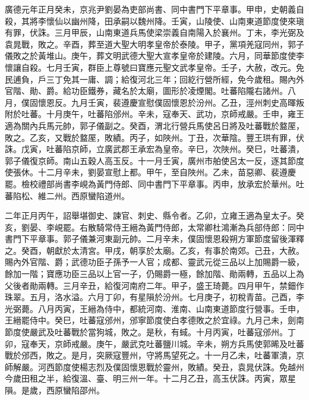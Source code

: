 \begin{pinyinscope}
 廣德元年正月癸未，京兆尹劉晏為吏部尚書、同中書門下平章事。甲申，史朝義自殺，其將李懷仙以幽州降，田承嗣以魏州降。壬寅，山陵使、山南東道節度使來瑱有罪，伏誅。三月甲辰，山南東道兵馬使梁崇義自南陽入於襄州。丁未，李光弼及袁晁戰，敗之。辛酉，葬至道大聖大明孝皇帝於泰陵。甲子，黨項羌寇同州，郭子儀敗之於黃堆山。庚午，葬文明武德大聖大宣孝皇帝於建陵。六月，同華節度使李懷讓自殺。七月壬寅，群臣上尊號曰寶應元聖文武孝皇帝。壬子，大赦，改元。免民逋負，戶三丁免其一庸、調；給復河北三年；回紇行營所經，免今歲租。賜內外官階、勛、爵。給功臣鐵券，藏名於太廟，圖形於凌煙閣。吐蕃陷隴右諸州。八月，僕固懷恩反。九月壬寅，裴遵慶宣慰僕固懷恩於汾州。乙丑，涇州刺史高暉叛附於吐蕃。十月庚午，吐蕃陷邠州。辛未，寇奉天、武功，京師戒嚴。壬申，雍王適為關內兵馬元帥，郭子儀副之。癸酉，渭北行營兵馬使呂日將及吐蕃戰於盩厔，敗之。乙亥，又戰於盩厔，敗績。丙子，如陜州。丁丑，次華陰。豐王珙有罪，伏誅。戊寅，吐蕃陷京師，立廣武郡王承宏為皇帝。辛巳，次陜州。癸巳，吐蕃潰，郭子儀復京師。南山五穀人高玉反。十一月壬寅，廣州市舶使呂太一反，逐其節度使張休。十二月辛未，劉晏宣慰上都。甲午，至自陜州。乙未，苗惡卿、裴遵慶罷。檢校禮部尚書李峴為黃門侍郎、同中書門下平章事。丙申，放承宏於華州。吐蕃陷松、維二州。西原蠻陷道州。



 二年正月丙午，詔舉堪御史、諫官、刺史、縣令者。乙卯，立雍王適為皇太子。癸亥，劉晏、李峴罷。右散騎常侍王縉為黃門侍郎，太常卿杜鴻漸為兵部侍郎：同中書門下平章事。郭子儀兼河東副元帥。二月辛未，僕固懷恩殺朔方軍節度留後渾釋之。癸酉，朝獻於太清宮。甲戌，朝享於太廟。乙亥，有事於南郊。己丑，大赦。賜內外官階、爵；武德功臣子孫予一人官；成都、靈武元從三品以上加賜爵一級，餘加一階；寶應功臣三品以上官一子，仍賜爵一極，餘加階、勛兩轉，五品以上為父後者勛兩轉。三月辛丑，給復河南府二年。甲子，盛王琦薨。四月甲午，禁鈿作珠翠。五月，洛水溢。六月丁卯，有星隕於汾州。七月庚子，初稅青苗。己酉，李光弼薨。八月丙寅，王縉為侍中，都統河南、淮南、山南東道節度行營事。壬申，王縉罷侍中。癸巳，吐蕃寇邠州，邠寧節度使白孝德敗之於宜祿。九月己未，劍南節度使嚴武及吐蕃戰於當狗城，敗之。是秋，有蜮。十月丙寅，吐蕃寇邠州。丁卯，寇奉天，京師戒嚴。庚午，嚴武克吐蕃鹽川城。辛未，朔方兵馬使郭晞及吐蕃戰於邠西，敗之。是月，突厥寇豐州，守將馬望死之。十一月乙未，吐蕃軍潰，京師解嚴。河西節度使楊志烈及僕固懷恩戰於靈州，敗績。癸丑，袁晁伏誅。免越州今歲田租之半，給復溫、臺、明三州一年。十二月乙丑，高玉伏誅。丙寅，眾星隕。是歲，西原蠻陷邵州。




\end{pinyinscope}
